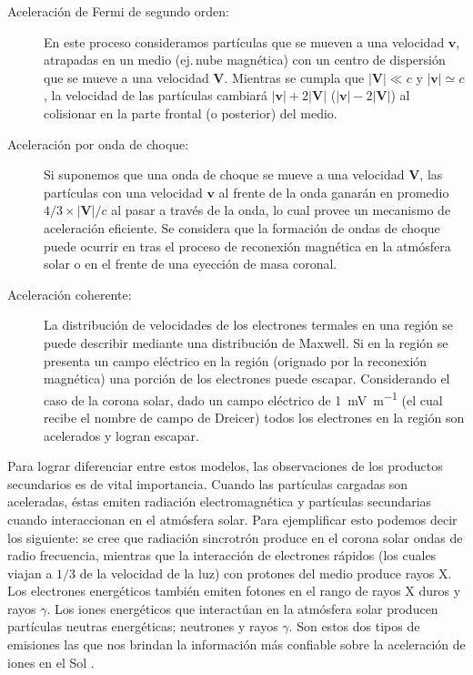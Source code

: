\begin{description}
  \item[Aceleración de Fermi de segundo orden:] En este proceso consideramos partículas que se mueven a una velocidad $\mathbf{v}$, atrapadas en un medio (ej.\,nube magnética) con un centro de dispersión que se mueve a una velocidad $\mathbf{V}$. Mientras se cumpla que $|\mathbf{V}|\ll c$ y $|\mathbf{v}|\simeq c$, la velocidad de las partículas cambiará $|\mathbf{v}|+2|\mathbf{V}|$ ($|\mathbf{v}|-2|\mathbf{V}|$) al colisionar en la parte frontal (o posterior) del medio.
  \item[Aceleración por onda de choque:] Si suponemos que una onda de choque se mueve a una velocidad $\mathbf{V}$, las partículas con una velocidad $\mathbf{v}$ al frente de la onda ganarán en promedio $4/3\times|\mathbf{V}|/c$ al pasar a través de la onda, lo cual provee un mecanismo de aceleración eficiente. Se considera que la formación de ondas de choque puede ocurrir en tras el proceso de reconexión magnética en la atmósfera solar o en el frente de una eyección de masa coronal.
  \item[Aceleración coherente:] La distribución de velocidades de los electrones termales en una región se puede describir mediante una distribución de Maxwell. Si en la región se presenta un campo eléctrico en la región (orignado por la reconexión magnética) una porción de los electrones puede escapar. Considerando el caso de la corona solar, dado un campo eléctrico de \SI{1}{\milli\volt\per\metre} (el cual recibe el nombre de campo de Dreicer) todos los electrones en la región son acelerados y logran escapar.
\end{description}

Para lograr diferenciar entre estos modelos, las observaciones de los productos secundarios es de vital importancia. Cuando las partículas cargadas son aceleradas, éstas emiten radiación electromagnética y partículas secundarias cuando interaccionan en el atmósfera solar. Para ejemplificar esto podemos decir los siguiente: se cree que radiación sincrotrón produce en el corona solar ondas de radio frecuencia, mientras que la interacción de electrones rápidos (los cuales viajan a $1/3$ de la velocidad de la luz) con protones del medio produce rayos X. Los electrones energéticos también emiten fotones en el rango de rayos X duros y rayos $\gamma$. Los iones energéticos que interactúan en la atmósfera solar producen partículas neutras energéticas; neutrones y rayos $\gamma$. Son estos dos tipos de emisiones las que nos brindan la información más confiable sobre la aceleración de iones en el Sol \nocite{diegophd,tsuchiyaphd}.

